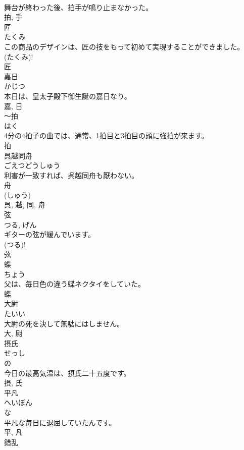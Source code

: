 \documentclass[8pt]{extreport}
\begin{document}
\begin{CJK}{UTF8}{min}
\\	舞台が終わった後、拍手が鳴り止まなかった。	
\\	拍, 手	
\\	匠	
\\	たくみ	
\\	この商品のデザインは、匠の技をもって初めて実現することができました。	
\\	(たくみ)!
\\	匠	
\\	嘉日	
\\	かじつ	
\\	本日は、皇太子殿下御生誕の嘉日なり。	
\\	嘉, 日	
\\	〜拍	
\\	はく	
\\	4分の4拍子の曲では、通常、1拍目と3拍目の頭に強拍が来ます。	
\\	拍	
\\	呉越同舟	
\\	ごえつどうしゅう	
\\	利害が一致すれば、呉越同舟も厭わない。	
\\	舟 
\\	(しゅう) 
\\	呉, 越, 同, 舟	
\\	弦	
\\	つる, げん	
\\	ギターの弦が緩んでいます。	
\\	(つる)!
\\	弦	
\\	蝶	
\\	ちょう	
\\	父は、毎日色の違う蝶ネクタイをしていた。	
\\	蝶	
\\	大尉	
\\	たいい	
\\	大尉の死を決して無駄にはしません。	
\\	大, 尉	
\\	摂氏	
\\	せっし	
\\	の 
\\	今日の最高気温は、摂氏二十五度です。	
\\	摂, 氏	
\\	平凡	
\\	へいぼん	
\\	な 
\\	平凡な毎日に退屈していたんです。	
\\	平, 凡	
\\	錯乱	

\end{CJK}
\end{document}
